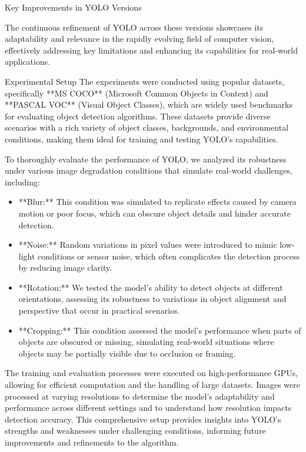 \documentclass[final]{beamer}
\newlength{\colwidth}
\begin{document}
\begin{frame}[t]
\begin{columns}[t]
\begin{column}{\colwidth}
\begin{block}{Key Improvements in YOLO Versions}
\begin{itemize}
    \end{itemize}

    The continuous refinement of YOLO across these versions showcases its adaptability and relevance in the rapidly evolving field of computer vision, effectively addressing key limitations and enhancing its capabilities for real-world applications.
\end{block}



\begin{block}{Experimental Setup}
    The experiments were conducted using popular datasets, specifically **MS COCO** (Microsoft Common Objects in Context) and **PASCAL VOC** (Visual Object Classes), which are widely used benchmarks for evaluating object detection algorithms. These datasets provide diverse scenarios with a rich variety of object classes, backgrounds, and environmental conditions, making them ideal for training and testing YOLO's capabilities.

    To thoroughly evaluate the performance of YOLO, we analyzed its robustness under various image degradation conditions that simulate real-world challenges, including:

    \begin{itemize}
      \item **Blur:** This condition was simulated to replicate effects caused by camera motion or poor focus, which can obscure object details and hinder accurate detection.
      \item **Noise:** Random variations in pixel values were introduced to mimic low-light conditions or sensor noise, which often complicates the detection process by reducing image clarity.
      \item **Rotation:** We tested the model’s ability to detect objects at different orientations, assessing its robustness to variations in object alignment and perspective that occur in practical scenarios.
      \item **Cropping:** This condition assessed the model's performance when parts of objects are obscured or missing, simulating real-world situations where objects may be partially visible due to occlusion or framing.
    \end{itemize}

    The training and evaluation processes were executed on high-performance GPUs, allowing for efficient computation and the handling of large datasets. Images were processed at varying resolutions to determine the model’s adaptability and performance across different settings and to understand how resolution impacts detection accuracy. This comprehensive setup provides insights into YOLO's strengths and weaknesses under challenging conditions, informing future improvements and refinements to the algorithm.
\end{block}


\end{column}
\end{columns}
\end{frame}
\end{document}
